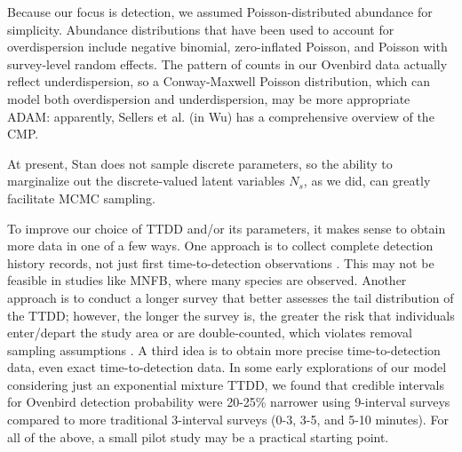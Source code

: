 \documentclass[useAMS,usenatbib,referee,12pt]{article}
\newcommand{\adam}[1]{{\color{blue} ADAM: #1}}
\begin{document}
Because our focus is detection, we assumed Poisson-distributed abundance for simplicity.  
Abundance distributions that have been used to account for overdispersion include negative binomial, zero-inflated Poisson, and Poisson with survey-level random effects.  
The pattern of counts in our Ovenbird data actually reflect underdispersion, so a Conway-Maxwell Poisson distribution, which can model both overdispersion and underdispersion, may be more appropriate \citep{Wu2015}\adam{apparently, Sellers et al. (in Wu) has a comprehensive overview of the CMP.}



At present, Stan does not sample discrete parameters, so the ability to marginalize out the discrete-valued latent variables $N_{s}$, as we did, can greatly facilitate MCMC sampling.





To improve our choice of TTDD and/or its parameters, it makes sense to obtain more data in one of a few ways.  
One approach is to collect complete detection history records, not just first time-to-detection observations \citep{Alldredge2007}.  
This may not be feasible in studies like MNFB, where many species are observed.  
Another approach is to conduct a longer survey that better assesses the tail distribution of the TTDD; however, the longer the survey is, the greater the risk that individuals enter/depart the study area or are double-counted, which violates removal sampling assumptions \citep{LeeMarsden2008, Reidy2011}.  
A third idea is to obtain more precise time-to-detection data, even exact time-to-detection data.  
In some early explorations of our model considering just an exponential mixture TTDD, we found that credible intervals for Ovenbird detection probability were 20-25\% narrower using 9-interval surveys compared to more traditional 3-interval surveys (0-3, 3-5, and 5-10 minutes).  
For all of the above, a small pilot study may be a practical starting point.  
\end{document}
